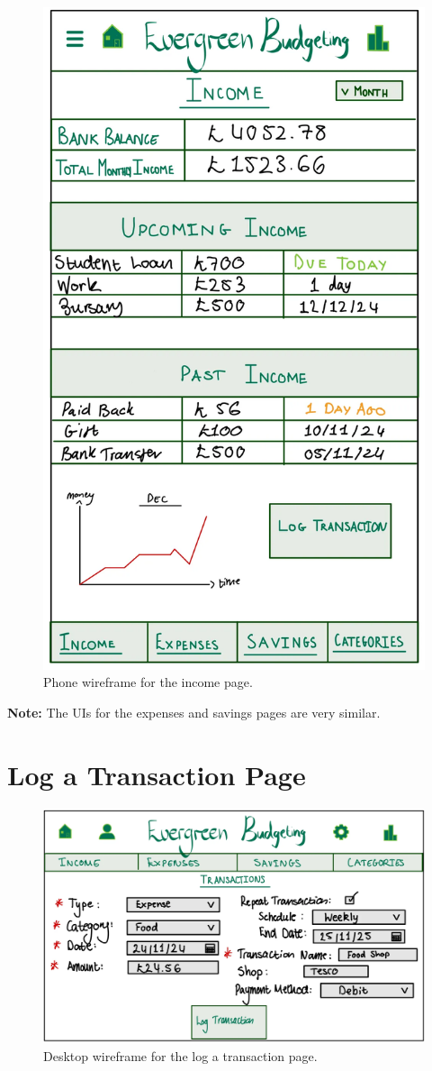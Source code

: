 \documentclass{l4proj}
\begin{document}
\begin{appendices}
\begin{figure}[htb]
    \centering
    \includegraphics[width=0.3\linewidth]{images/Wireframes/wireframe-income-phone.png}
    \caption{Phone wireframe for the income page.}
    \label{fig:enter-label}
\end{figure}
\vspace{0.5em}
\textbf{Note:} The UIs for the expenses and savings pages are very similar.

\newpage

\section{Log a Transaction Page}
\begin{figure}[htb]
    \centering
    \includegraphics[width=0.75\linewidth]{images/Wireframes/wireframe-trans-desktop.png}
    \caption{Desktop wireframe for the log a transaction page.}
    \label{fig:enter-label}
\end{figure}


\end{appendices}
\end{document}
